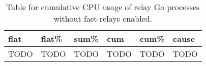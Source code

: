 \begin{table}
    \caption{Table for cumulative CPU usage of relay Go processes without fast-relays enabled.}
    \label{tab:non-ebpf-cpu-usage-top}
    \begin{tabular}{llllll}
    \toprule
    flat & flat\% & sum\% & cum & cum\% & cause \\
    \midrule
    TODO & TODO & TODO & TODO & TODO & TODO \\
    \bottomrule
\end{tabular}
\end{table}
    